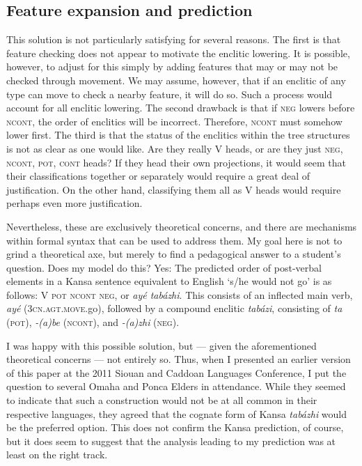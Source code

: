 \documentclass[output=paper]{LSP/langsci}
\begin{document}
\subsection{Feature expansion and prediction}
This solution is not particularly satisfying for several reasons. The first is that feature checking does not appear to motivate the enclitic lowering. It is possible, however, to adjust for this simply by adding features that may or may not be checked through movement. We may assume, however, that if an enclitic of any type can move to check a nearby feature, it will do so. Such a process would account for all enclitic lowering. The second drawback is that if \textsc{neg} lowers before \textsc{ncont}, the order of enclitics will be incorrect. Therefore, \textsc{ncont} must somehow lower first. The third is that the status of the enclitics within the tree structures is not as clear as one would like. Are they really V heads, or are they just \textsc{neg, ncont, pot, cont} heads? If they head their own projections, it would seem that their classifications together or separately would require a great deal of justification. On the other hand, classifying them all as V heads would require perhaps even more justification.

Nevertheless, these are exclusively theoretical concerns, and there are mechanisms within formal syntax that can be used to address them. My goal here is not to grind a theoretical axe, but merely to find a pedagogical answer to a student's question. Does my model do this? Yes: The predicted order of post-verbal elements in a Kansa sentence equivalent to English `s/he would not go' is as follows: V \textsc{pot ncont} \textsc{neg}, or \textit{ay\'e tab\'azhi}. This consists of an inflected main verb, \textit{ay\'e} (\textsc{3cn.agt.move}.go), followed by a compound enclitic \textit{tab\'azi}, consisting of \textit{ta} (\textsc{pot}), \textit{-(a)be} (\textsc{ncont}), and \textit{-(a)zhi} (\textsc{neg}).
	
I was happy with this possible solution, but --- given the aforementioned theoretical concerns --- not entirely so. Thus, when I presented an earlier version of this paper at the 2011 Siouan and Caddoan Languages Conference, I put the question to several Omaha and Ponca Elders in attendance. While they seemed to indicate that such a construction would not be at all common in their respective languages, they agreed that the cognate form of Kansa \textit{tab\'azhi} would be the preferred option. This does not confirm the Kansa prediction, of course, but it does seem to suggest that the analysis leading to my prediction was at least on the right track.
\end{document}
